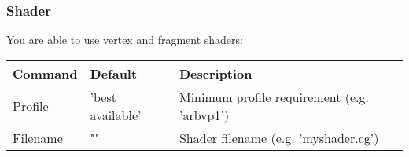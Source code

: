 \subsubsection{Shader}
You are able to use vertex and fragment shaders:\\
\begin{tabular}{|p{2.5cm}|p{2.5cm}|p{9cm}|}
\hline
\textbf{Command} & \textbf{Default} & \textbf{Description}\\
\hline
Profile  & 'best available' & Minimum profile requirement (e.g. 'arbvp1')\\
\hline
Filename & ""               & Shader filename (e.g. 'myshader.cg')\\
\hline
\end{tabular}
